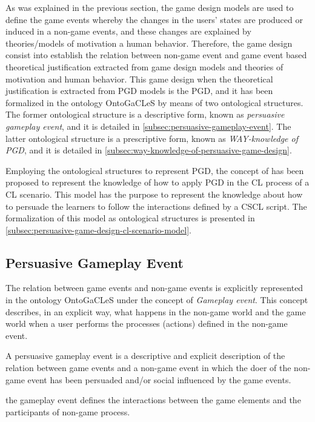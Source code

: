 As was explained in the previous section, the game design models are used to define the game events whereby the changes in the users’ states are produced or induced in a non-game events, and these changes are explained by theories/models of motivation a human behavior. Therefore, the game design consist into establish the relation between non-game event and game event based theoretical justification extracted from game design models and theories of motivation and human behavior. This game design when the theoretical justification is extracted from PGD models is the PGD, and it has been formalized in the ontology OntoGaCLeS by means of two ontological structures. The former ontological structure is a descriptive form, known as \emph{persuasive gameplay event}, and it is detailed in \autoref{subsec:persuasive-gameplay-event}. The latter ontological structure is a prescriptive form, known as \emph{WAY-knowledge of PGD}, and it is detailed in \autoref{subsec:way-knowledge-of-persuasive-game-design}.

Employing the ontological structures to represent PGD, the concept of  has been proposed to represent the knowledge of how to apply PGD in the CL process of a CL scenario. This model has the purpose to represent the knowledge about how to persuade the learners to follow the interactions defined by a CSCL script. The formalization of this model as ontological structures is presented in \autoref{subsec:persuasive-game-design-cl-scenario-model}.

\subsection{Persuasive Gameplay Event}
\label{subsec:persuasive-gameplay-event}

The relation between game events and non-game events is explicitly represented in the ontology OntoGaCLeS under the concept of \emph{Gameplay event}. This concept describes, in an explicit way, what happens in the non-game world and the game world when a user performs the processes (actions) defined in the non-game event.



A persuasive gameplay event is a descriptive and explicit description of the relation between game events and a non-game event in which the doer of the non-game event has been persuaded and/or social influenced by the game events.

the gameplay event defines the interactions between the game elements and the participants of non-game process. 



